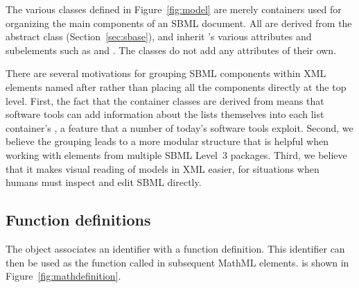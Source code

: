 The various \ListOf classes defined in Figure~\ref{fig:model} are
merely containers used for organizing the main components of an
SBML document.  All are derived from the abstract class \SBase
(Section~\ref{sec:sbase}), and inherit \SBase's various attributes
and subelements such as  and .
The \ListOf classes do not add any attributes of their own.

There are several motivations for grouping SBML components within
XML elements named after  rather than
placing all the components directly at the top level.  First, the
fact that the container classes are derived from \SBase means that
software tools can add information about the lists themselves into
each list container's , a feature that a number
of today's software tools exploit.  Second, we believe the
grouping leads to a more modular structure that is helpful when
working with elements from multiple SBML Level~3 packages.  Third,
we believe that it makes visual reading of models in XML easier,
for situations when humans must inspect and edit SBML directly.


\subsection{Function definitions}
\label{sec:functiondefinition}

The \FunctionDefinition object associates an identifier with a
function definition.  This identifier can then be used as the
function called in subsequent MathML  elements.
\FunctionDefinition is shown in Figure~\ref{fig:mathdefinition}.

